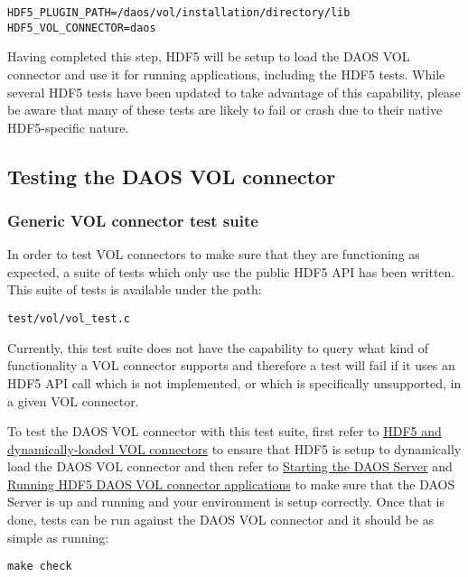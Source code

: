 \begin{verbatim}
HDF5_PLUGIN_PATH=/daos/vol/installation/directory/lib
HDF5_VOL_CONNECTOR=daos
\end{verbatim}

Having completed this step, HDF5 will be setup to load the DAOS VOL connector and use it for running applications, including the HDF5 tests. While several HDF5 tests have been updated to take advantage of this capability, please be aware that many of these tests are likely to fail or crash due to their native HDF5-specific nature.

\newpage

\subsection{Testing the DAOS VOL connector}

\subsubsection{Generic VOL connector test suite}

In order to test VOL connectors to make sure that they are functioning as expected, a suite of tests which only use the public HDF5 API has been written. This suite of tests is available under the path:

\begin{verbatim}
test/vol/vol_test.c
\end{verbatim}

Currently, this test suite does not have the capability to query what kind of functionality a VOL connector supports and therefore a test will fail if it uses an HDF5 API call which is not implemented, or which is specifically unsupported, in a given VOL connector.

To test the DAOS VOL connector with this test suite, first refer to \hyperref[hdf5:dynamically_loaded_connectors]{HDF5 and dynamically-loaded VOL connectors} to ensure that HDF5 is setup to dynamically load the DAOS VOL connector and then refer to \hyperref[sec:daos_serv_start]{Starting the DAOS Server} and \hyperref[running_daos_vol_apps]{Running HDF5 DAOS VOL connector applications} to make sure that the DAOS Server is up and running and your environment is setup correctly. Once that is done, tests can be run against the DAOS VOL connector and it should be as simple as running:

\begin{verbatim}
make check
\end{verbatim}

